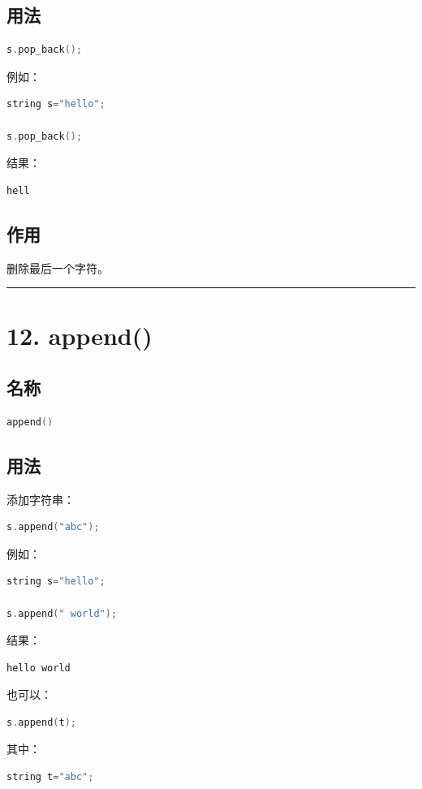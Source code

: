 \documentclass[9pt,twocolumn]{extarticle}
\begin{document}
\subsection{用法}
\begin{lstlisting}[language=C++]
s.pop_back();
\end{lstlisting}
例如：
\begin{lstlisting}[language=C++]
string s="hello";

s.pop_back();
\end{lstlisting}
结果：
\begin{lstlisting}
hell
\end{lstlisting}

\subsection{作用}
删除最后一个字符。

\noindent\rule{\linewidth}{0.4pt}

\section{12. append()}

\subsection{名称}
\begin{lstlisting}[language=C++]
append()
\end{lstlisting}

\subsection{用法}
添加字符串：
\begin{lstlisting}[language=C++]
s.append("abc");
\end{lstlisting}
例如：
\begin{lstlisting}[language=C++]
string s="hello";

s.append(" world");
\end{lstlisting}
结果：
\begin{lstlisting}
hello world
\end{lstlisting}
也可以：
\begin{lstlisting}[language=C++]
s.append(t);
\end{lstlisting}
其中：
\begin{lstlisting}[language=C++]
string t="abc";
\end{lstlisting}
\end{document}
